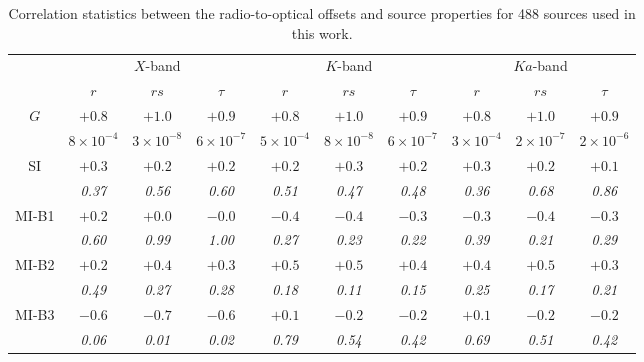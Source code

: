 \documentclass[referee]{aa}        %
\begin{document}
    \begin{table}
        \centering
        \caption{\label{tab:corr_test}
            Correlation statistics between the radio-to-optical offsets and source properties for 488 sources used in this work.
        }
        \begin{tabular}{cccccccccc}
        \hline \noalign{\smallskip}
            &\multicolumn{3}{c}{$X$-band}  &\multicolumn{3}{c}{$K$-band}  &\multicolumn{3}{c}{$Ka$-band}  \\
            \cmidrule(lr){2-4}  \cmidrule(lr){5-7}  \cmidrule(lr){8-10}
            &$r$  &$rs$  &$\tau$  &$r$  &$rs$  &$\tau$  &$r$  &$rs$  &$\tau$  \\
        \noalign{\smallskip}
        \hline
        \noalign{\smallskip}
          $G$  &$+0.8$  &$+1.0$  &$+0.9$  &$+0.8$  &$+1.0$  &$+0.9$  &$+0.8$  &$+1.0$  &$+0.9$  \\
               &\textit{$8 \times 10^{-4}$}  &\textit{$3 \times 10^{-8}$}  &\textit{$6 \times 10^{-7}$}
               &\textit{$5 \times 10^{-4}$}  &\textit{$8 \times 10^{-8}$}  &\textit{$6 \times 10^{-7}$}
               &\textit{$3 \times 10^{-4}$}  &\textit{$2 \times 10^{-7}$}  &\textit{$2 \times 10^{-6}$}  \\
           SI  &$+0.3$  &$+0.2$  &$+0.2$  &$+0.2$  &$+0.3$  &$+0.2$  &$+0.3$  &$+0.2$  &$+0.1$  \\
               &\textit{0.37}  &\textit{0.56}  &\textit{0.60}  &\textit{0.51}  &\textit{0.47}  &\textit{0.48}  &\textit{0.36}  &\textit{0.68}  &\textit{0.86}  \\
        MI-B1  &$+0.2$  &$+0.0$  &$-0.0$  &$-0.4$  &$-0.4$  &$-0.3$  &$-0.3$  &$-0.4$  &$-0.3$  \\
               &\textit{0.60}  &\textit{0.99}  &\textit{1.00}  &\textit{0.27}  &\textit{0.23}  &\textit{0.22}  &\textit{0.39}  &\textit{0.21}  &\textit{0.29}  \\
        MI-B2  &$+0.2$  &$+0.4$  &$+0.3$  &$+0.5$  &$+0.5$  &$+0.4$  &$+0.4$  &$+0.5$  &$+0.3$  \\
               &\textit{0.49}  &\textit{0.27}  &\textit{0.28}  &\textit{0.18}  &\textit{0.11}  &\textit{0.15}  &\textit{0.25}  &\textit{0.17}  &\textit{0.21}  \\
        MI-B3  &$-0.6$  &$-0.7$  &$-0.6$  &$+0.1$  &$-0.2$  &$-0.2$  &$+0.1$  &$-0.2$  &$-0.2$  \\
               &\textit{0.06}  &\textit{0.01}  &\textit{0.02}  &\textit{0.79}  &\textit{0.54}  &\textit{0.42}  &\textit{0.69}  &\textit{0.51}  &\textit{0.42}  \\

\end{tabular}
\end{table}
\end{document}
